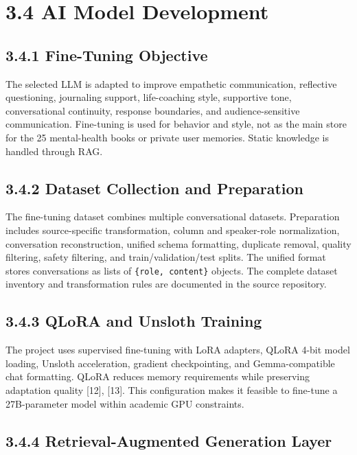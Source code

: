 \documentclass[
  letterpaper,
  12pt,
  a4paper,
  openany]{report}
\begin{document}
\section{3.4 AI Model Development}\label{ai-model-development}

\subsection{3.4.1 Fine-Tuning Objective}\label{fine-tuning-objective}

The selected LLM is adapted to improve empathetic communication,
reflective questioning, journaling support, life-coaching style,
supportive tone, conversational continuity, response boundaries, and
audience-sensitive communication. Fine-tuning is used for behavior and
style, not as the main store for the 25 mental-health books or private
user memories. Static knowledge is handled through RAG.

\subsection{3.4.2 Dataset Collection and
Preparation}\label{dataset-collection-and-preparation}

The fine-tuning dataset combines multiple conversational datasets.
Preparation includes source-specific transformation, column and
speaker-role normalization, conversation reconstruction, unified schema
formatting, duplicate removal, quality filtering, safety filtering, and
train/validation/test splits. The unified format stores conversations as
lists of \texttt{\{role,\ content\}} objects. The complete dataset
inventory and transformation rules are documented in the source
repository.

\subsection{3.4.3 QLoRA and Unsloth
Training}\label{qlora-and-unsloth-training}

The project uses supervised fine-tuning with LoRA adapters, QLoRA 4-bit
model loading, Unsloth acceleration, gradient checkpointing, and
Gemma-compatible chat formatting. QLoRA reduces memory requirements
while preserving adaptation quality {[}12{]}, {[}13{]}. This
configuration makes it feasible to fine-tune a 27B-parameter model
within academic GPU constraints.

\subsection{3.4.4 Retrieval-Augmented Generation
Layer}\label{retrieval-augmented-generation-layer}
\end{document}
